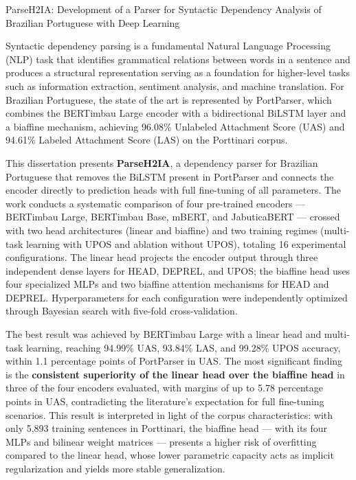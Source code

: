 \begin{englishabstract}{ParseH2IA: Development of a Parser for Syntactic Dependency Analysis of Brazilian Portuguese with Deep Learning}

Syntactic dependency parsing is a fundamental Natural Language Processing (NLP) task that
identifies grammatical relations between words in a sentence and produces a structural
representation serving as a foundation for higher-level tasks such as information extraction,
sentiment analysis, and machine translation. For Brazilian Portuguese, the state of the art is
represented by PortParser, which combines the BERTimbau Large encoder with a bidirectional
BiLSTM layer and a biaffine mechanism, achieving 96.08\% Unlabeled Attachment Score (UAS) and
94.61\% Labeled Attachment Score (LAS) on the Porttinari corpus.

This dissertation presents \textbf{ParseH2IA}, a dependency parser for Brazilian Portuguese
that removes the BiLSTM present in PortParser and connects the encoder directly to prediction
heads with full fine-tuning of all parameters. The work conducts a systematic comparison of
four pre-trained encoders --- BERTimbau Large, BERTimbau Base, mBERT, and JabuticaBERT ---
crossed with two head architectures (linear and biaffine) and two training regimes (multi-task
learning with UPOS and ablation without UPOS), totaling 16 experimental configurations. The
linear head projects the encoder output through three independent dense layers for HEAD, DEPREL,
and UPOS; the biaffine head uses four specialized MLPs and two biaffine attention mechanisms for
HEAD and DEPREL. Hyperparameters for each configuration were independently optimized through
Bayesian search with five-fold cross-validation.

The best result was achieved by BERTimbau Large with a linear head and multi-task learning,
reaching 94.99\% UAS, 93.84\% LAS, and 99.28\% UPOS accuracy, within 1.1 percentage points of
PortParser in UAS. The most significant finding is the \textbf{consistent superiority of the
linear head over the biaffine head} in three of the four encoders evaluated, with margins of
up to 5.78 percentage points in UAS, contradicting the literature's expectation for full
fine-tuning scenarios. This result is interpreted in light of the corpus characteristics: with
only 5,893 training sentences in Porttinari, the biaffine head --- with its four MLPs and
bilinear weight matrices --- presents a higher risk of overfitting compared to the linear head,
whose lower parametric capacity acts as implicit regularization and yields more stable
generalization.


\end{englishabstract}
